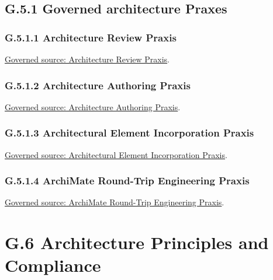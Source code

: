 \subsection*{G.5.1 Governed architecture Praxes}
\label{navigation:G.5.1}

\subsubsection*{G.5.1.1 Architecture Review Praxis}
\label{navigation:G.5.1.1}

\href{../../../../../../../governance/architecture-review-praxis.md}{Governed source: Architecture Review Praxis}.\par
\subsubsection*{G.5.1.2 Architecture Authoring Praxis}
\label{navigation:G.5.1.2}

\href{../../../../../../../governance/architecture-authoring-praxis.md}{Governed source: Architecture Authoring Praxis}.\par
\subsubsection*{G.5.1.3 Architectural Element Incorporation Praxis}
\label{navigation:G.5.1.3}

\href{../../../../../../../governance/continuum-incorporation-praxis.md}{Governed source: Architectural Element Incorporation Praxis}.\par
\subsubsection*{G.5.1.4 ArchiMate Round-Trip Engineering Praxis}
\label{navigation:G.5.1.4}

\href{../../../../../../../governance/archimate-round-trip-engineering-praxis.md}{Governed source: ArchiMate Round-Trip Engineering Praxis}.\par
\section*{G.6 Architecture Principles and Compliance}
\label{navigation:G.6}

